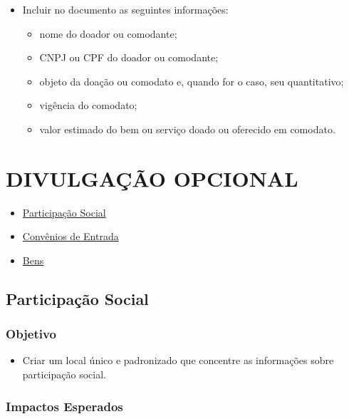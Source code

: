 \documentclass[]{book}
\providecommand{\tightlist}{%
  \setlength{\itemsep}{0pt}\setlength{\parskip}{0pt}}
\begin{document}
\begin{itemize}
\tightlist
\item
  Incluir no documento as seguintes informações:

  \begin{itemize}
  \tightlist
  \item
    nome do doador ou comodante;
  \item
    CNPJ ou CPF do doador ou comodante;
  \item
    objeto da doação ou comodato e, quando for o caso, seu quantitativo;
  \item
    vigência do comodato;
  \item
    valor estimado do bem ou serviço doado ou oferecido em comodato.
  \end{itemize}
\end{itemize}

\hypertarget{divulgauxe7uxe3o-opcional}{%
\chapter{DIVULGAÇÃO OPCIONAL}\label{divulgauxe7uxe3o-opcional}}

\begin{itemize}
\tightlist
\item
  \href{participacao-social.html}{Participação Social}
\item
  \href{convenios-entrada.html}{Convênios de Entrada}
\item
  \href{bens.html}{Bens}
\end{itemize}

\hypertarget{participauxe7uxe3o-social}{%
\section{Participação Social}\label{participauxe7uxe3o-social}}

\hypertarget{objetivo-12}{%
\subsection{Objetivo}\label{objetivo-12}}

\begin{itemize}
\tightlist
\item
  Criar um local único e padronizado que concentre as informações sobre participação social.
\end{itemize}

\hypertarget{impactos-esperados-13}{%
\subsection{Impactos Esperados}\label{impactos-esperados-13}}
\end{document}
